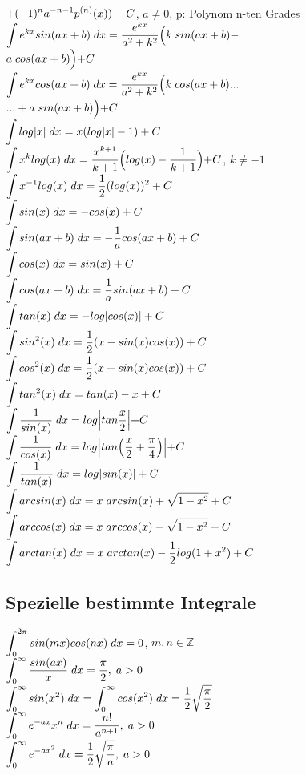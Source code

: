 $\mathlarger{+(-1)^na^{-n-1}p^{(n)}(x))+C}$, $a\neq 0$, p: Polynom n-ten Grades\\
$\mathlarger{\int e^{kx}sin(ax+b)\;dx=\frac{e^{kx}}{a^2+k^2}\Bigl(k\;sin(ax+b)-}$\\
$\mathlarger{a\;cos(ax+b)\Bigl)+C}$\\
$\mathlarger{\int e^{kx}cos(ax+b)\;dx=\frac{e^{kx}}{a^2 + k^2}\Bigl(k\;cos(ax+b)...}$\\
$\mathlarger{...+a\;sin(ax+b)\Bigl)+C}$\\
$\mathlarger{\int log|x|\;dx= x(log|x|-1)+C}$\\
$\mathlarger{\int x^k log(x)\;dx=\frac{x^{k+1}}{k+1}\Bigl(log(x)-\frac{1}{k+1}\Bigl)+C}$, $k\neq -1$\\
$\mathlarger{\int x^{-1}log(x)\;dx= \frac{1}{2}(log(x))^2 + C}$\\
$\mathlarger{\int sin(x)\;dx=-cos(x)+C}$\\
$\mathlarger{\int sin(ax+b)\;dx=-\frac{1}{a}cos(ax+b)+C}$\\
$\mathlarger{\int cos(x)\;dx=sin(x)+C}$\\
$\mathlarger{\int cos(ax+b)\;dx=\frac{1}{a}sin(ax+b)+C}$\\
$\mathlarger{\int tan(x)\;dx= - log|cos(x)|+C}$\\
$\mathlarger{\int sin^2(x)\;dx= \frac{1}{2}(x-sin(x)cos(x))+C}$\\
$\mathlarger{\int cos^2(x)\;dx= \frac{1}{2}(x+sin(x)cos(x))+C}$\\
$\mathlarger{\int tan^2(x)\;dx= tan(x)-x+C}$\\
$\mathlarger{\int \frac{1}{sin(x)}\;dx=log\Bigl|tan\frac{x}{2}\Bigl|+C}$\\
$\mathlarger{\int \frac{1}{cos(x)}\;dx=log\Bigl|tan\Bigl(\frac{x}{2}+\frac{\pi}{4}\Bigl)\Bigl|+C}$\\
$\mathlarger{\int \frac{1}{tan(x)}\;dx=log|sin(x)|+C}$\\
$\mathlarger{\int arcsin(x)\;dx=x\;arcsin(x)+\sqrt{1-x^2}+C}$\\
$\mathlarger{\int arccos(x)\;dx=x\;arccos(x)-\sqrt{1-x^2}+C}$\\
$\mathlarger{\int arctan(x)\;dx=x\;arctan(x)-\frac{1}{2}log(1+x^2)+C}$\\

\vspace{1cm}
\subsection{Spezielle bestimmte Integrale}
$\mathlarger{\int_0^{2\pi} sin(mx)cos(nx)\;dx=0}$, $m,n\in \mathbb{Z}$\\
$\mathlarger{\int_0^\infty \frac{sin(ax)}{x}\;dx=\frac{\pi}{2},\;a>0}$\\
$\mathlarger{\int_0^\infty sin(x^2)\;dx=\int_0^\infty cos(x^2)\;dx=\frac{1}{2}\sqrt{\frac{\pi}{2}}}$\\
$\mathlarger{\int_0^\infty e^{-ax}x^n\;dx= \frac{n!}{a^{n+1}},\;a>0}$\\
$\mathlarger{\int_0^\infty e^{-ax^2}\;dx=\frac{1}{2}\sqrt{\frac{\pi}{a}},\;a>0}$\\
